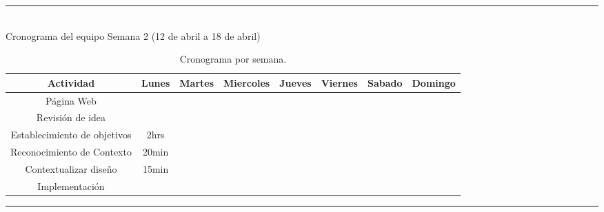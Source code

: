 \documentclass{article}
\begin{document}
\rule{0.8\textwidth}{.8pt}\\

Cronograma del equipo Semana 2 (12 de abril a 18 de abril)
\\

\begin{center}
  \begin{table}[H]
    \centering
    \begin{tabular}{| c | c | c | c | c | c | c | c | }
      \hline
      Actividad & Lunes  & Martes  & Miercoles  & Jueves  & Viernes  & Sabado & Domingo  \\
      \hline
      Página Web & & & & & & & \\ \hline
      Revisión de idea & & & & & & &    \\ \hline
      Establecimiento de objetivos & 2hrs & &  & & & &  \\ \hline
      Reconocimiento de Contexto & 20min & & & & & & \\ \hline
      Contextualizar diseño & 15min & &  & & & &  \\ \hline
      Implementación & & &  & & & &  \\ \hline
    \end{tabular}
    \caption{Cronograma por semana.}
    \label{tabla:horarios}
  \end{table}
\end{center}

\rule{0.8\textwidth}{.8pt}\\
\end{document}
